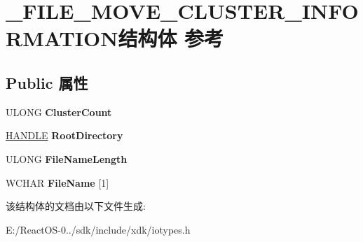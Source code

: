 \hypertarget{struct___f_i_l_e___m_o_v_e___c_l_u_s_t_e_r___i_n_f_o_r_m_a_t_i_o_n}{}\section{\+\_\+\+F\+I\+L\+E\+\_\+\+M\+O\+V\+E\+\_\+\+C\+L\+U\+S\+T\+E\+R\+\_\+\+I\+N\+F\+O\+R\+M\+A\+T\+I\+O\+N结构体 参考}
\label{struct___f_i_l_e___m_o_v_e___c_l_u_s_t_e_r___i_n_f_o_r_m_a_t_i_o_n}
\subsection*{Public 属性}
\begin{DoxyCompactItemize}
\item 
\mbox{\label{struct___f_i_l_e___m_o_v_e___c_l_u_s_t_e_r___i_n_f_o_r_m_a_t_i_o_n_a4cd75bede1c7238aeb923c7ce29603de}} 
U\+L\+O\+NG {\bfseries Cluster\+Count}
\item 
\mbox{\label{struct___f_i_l_e___m_o_v_e___c_l_u_s_t_e_r___i_n_f_o_r_m_a_t_i_o_n_a0354fc3828918dd19cdb8623e1118f5e}} 
\hyperlink{interfacevoid}{H\+A\+N\+D\+LE} {\bfseries Root\+Directory}
\item 
\mbox{\label{struct___f_i_l_e___m_o_v_e___c_l_u_s_t_e_r___i_n_f_o_r_m_a_t_i_o_n_a691ba1241896577f475677962a035ea1}} 
U\+L\+O\+NG {\bfseries File\+Name\+Length}
\item 
\mbox{\label{struct___f_i_l_e___m_o_v_e___c_l_u_s_t_e_r___i_n_f_o_r_m_a_t_i_o_n_a484ba9a11034d3c06410ee7149c5345e}} 
W\+C\+H\+AR {\bfseries File\+Name} \mbox{[}1\mbox{]}
\end{DoxyCompactItemize}


该结构体的文档由以下文件生成\+:\begin{DoxyCompactItemize}
\item 
E\+:/\+React\+O\+S-\/0../sdk/include/xdk/iotypes.\+h\end{DoxyCompactItemize}
